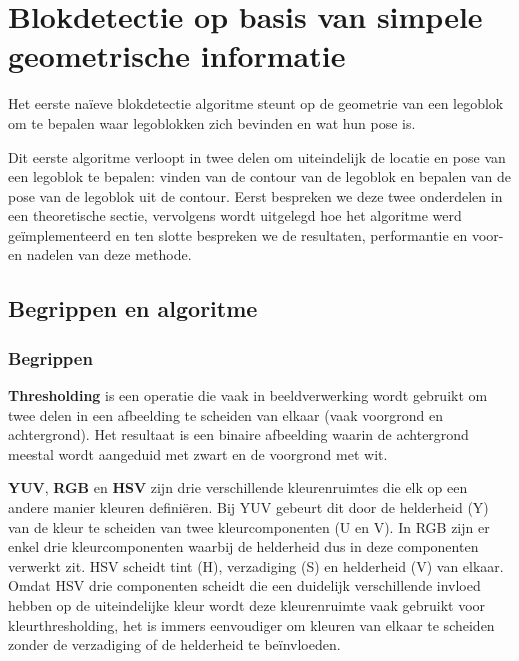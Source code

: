 \section{Blokdetectie op basis van simpele geometrische informatie}
Het eerste na\"ieve blokdetectie algoritme steunt op de geometrie van een legoblok om te bepalen waar legoblokken zich bevinden en wat hun pose is. 

Dit eerste algoritme verloopt in twee delen om uiteindelijk de locatie en pose van een legoblok te bepalen: vinden van de contour van de legoblok en bepalen van de pose van de legoblok uit de contour. Eerst bespreken we deze twee onderdelen in een theoretische sectie, vervolgens wordt uitgelegd hoe het algoritme werd ge\"implementeerd en ten slotte bespreken we de resultaten, performantie en voor-en nadelen van deze methode.

\subsection{Begrippen en algoritme} \label{sec:alg1_begrip}

\subsubsection*{Begrippen}

\textbf{Thresholding} is een operatie die vaak in beeldverwerking wordt gebruikt om twee delen in een afbeelding te scheiden van elkaar (vaak voorgrond en achtergrond). Het resultaat is een binaire afbeelding waarin de achtergrond meestal wordt aangeduid met zwart en de voorgrond met wit.

\textbf{YUV}, \textbf{RGB} en \textbf{HSV} zijn drie verschillende kleurenruimtes die elk op een andere manier kleuren defini\"eren. Bij YUV gebeurt dit door de helderheid (Y) van de kleur te scheiden van twee kleurcomponenten (U en V). In RGB zijn er enkel drie kleurcomponenten waarbij de helderheid dus in deze componenten verwerkt zit. HSV scheidt tint (H), verzadiging (S) en helderheid (V) van elkaar. Omdat HSV drie componenten scheidt die een duidelijk verschillende invloed hebben op de uiteindelijke kleur wordt deze kleurenruimte vaak gebruikt voor kleurthresholding, het is immers eenvoudiger om kleuren van elkaar te scheiden zonder de verzadiging of de helderheid te be\"invloeden.

